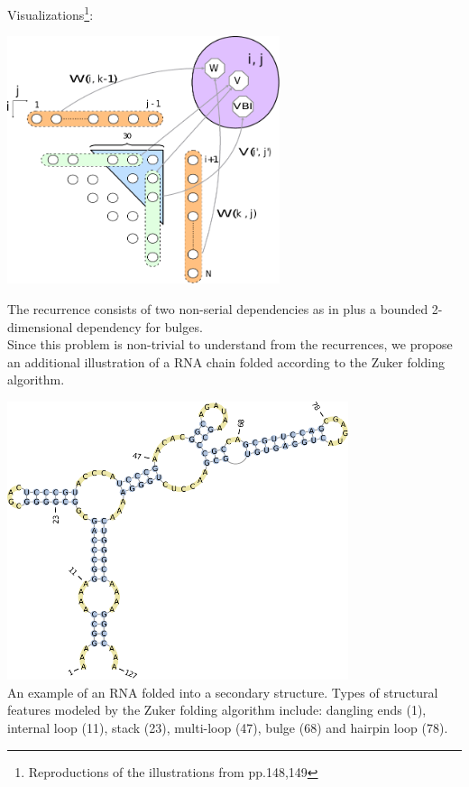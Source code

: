 \item Visualizations\footnote{Reproductions of the illustrations from \cite{para_dprec} pp.148,149}:
\begin{center}\includegraphics[width=8cm]{inc/zuker_rec.pdf}\end{center}
The recurrence consists of two non-serial dependencies as in \textit{} plus a bounded 2-dimensional dependency for bulges.\\[12pt]
Since this problem is non-trivial to understand from the recurrences, we propose an additional illustration of a RNA chain folded according to the Zuker folding algorithm.
\begin{center}
\includegraphics[width=10cm]{inc/zuker_struct.pdf} \\
\small An example of an RNA folded into a secondary structure. Types of structural features modeled by the Zuker folding algorithm include: dangling ends (1), internal loop (11), stack (23), multi-loop (47), bulge (68) and hairpin loop (78).
\end{center}

